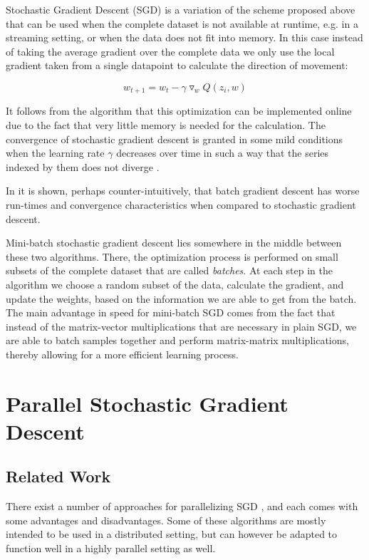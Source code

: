 \documentclass[11pt,a4paper]{article}
\begin{document}
Stochastic Gradient Descent (SGD) is a variation of the scheme proposed above that can be used
when the complete dataset is not available at runtime, e.g. in a streaming setting,
or when the data does not fit into memory.
In this case instead of taking the average gradient over the complete data we only use the local
gradient taken from a single datapoint to calculate the direction of movement:

\begin{equation}
w_{t + 1} = w_t - \gamma  \triangledown_w Q(z_i, w)
\end{equation}

It follows from the algorithm that this optimization can be implemented online due to the fact that
very little memory is needed for the calculation. The convergence of stochastic gradient descent is granted
in  some mild conditions when the learning rate $\gamma$ decreases over time in such a way that the
series  indexed by them does not diverge \citep{bottou2010large}.

In \citep{wilson2003general} it is shown, perhaps counter-intuitively, that batch gradient descent has
worse run-times and convergence characteristics when compared to stochastic gradient descent.

Mini-batch stochastic gradient descent lies somewhere in the middle between these two algorithms.
There, the optimization process is performed on small subsets of the complete dataset that are
called \textit{batches}. At each step in the algorithm we choose a random subset of the data,
calculate the gradient, and update the weights, based on the information we are able to get from
the batch. The main advantage in speed for mini-batch SGD comes from the fact that instead of the
matrix-vector multiplications that are necessary in plain SGD, we are able to batch samples
together and perform matrix-matrix multiplications, thereby allowing for a more efficient learning
process.

\section{Parallel Stochastic Gradient Descent}
\subsection{Related Work}

There exist a number of approaches for parallelizing SGD \citep{zinkevich2010parallelized,
recht2011hogwild, dekel2012optimal}, and each comes with some advantages and disadvantages. Some of
these algorithms are mostly intended to be used in a distributed setting, but can however be
adapted to function well in a highly parallel setting as well.
\end{document}
